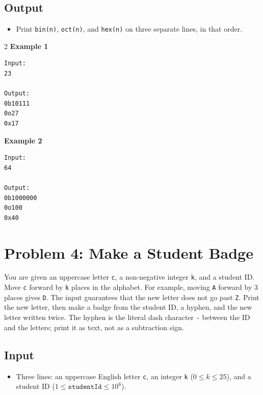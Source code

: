 \documentclass[12pt,oneside,openany]{article}
\begin{document}
\subsection*{Output}
\begin{itemize}
    \item Print \texttt{bin(n)}, \texttt{oct(n)}, and \texttt{hex(n)} on three separate lines, in that order.
\end{itemize}
\vspace{0.2cm}

\begin{example*}{}{}
\begin{multicols}{2}
\textbf{Example 1}
\begin{verbatim}
Input:
23

Output:
0b10111
0o27
0x17
\end{verbatim}
\textbf{Example 2}
\begin{verbatim}
Input:
64

Output:
0b1000000
0o100
0x40
\end{verbatim}
\end{multicols}
\end{example*}
\newpage
\section*{Problem 4: Make a Student Badge}

You are given an uppercase letter \texttt{c}, a non-negative integer \texttt{k}, and a student ID. Move \texttt{c} forward by \texttt{k} places in the alphabet. For example, moving \texttt{A} forward by 3 places gives \texttt{D}. The input guarantees that the new letter does not go past \texttt{Z}. Print the new letter, then make a badge from the student ID, a hyphen, and the new letter written twice. The hyphen is the literal dash character \texttt{-} between the ID and the letters; print it as text, not as a subtraction sign.

\subsection*{Input}
\begin{itemize}
    \item Three lines: an uppercase English letter \texttt{c}, an integer \texttt{k} ($0 \leq k \leq 25$), and a student ID ($1 \leq \texttt{studentId} \leq 10^6$).
\end{itemize}
\end{document}
